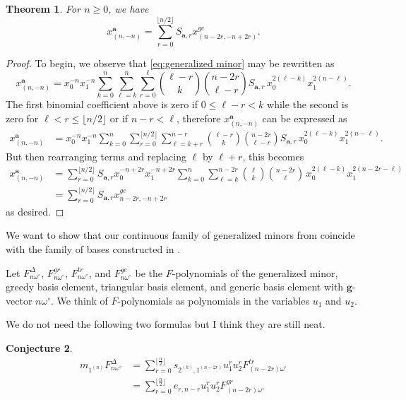\documentclass{amsart}
\newtheorem{theorem}{Theorem}
\newtheorem{conjecture}[theorem]{Conjecture}
\numberwithin{theorem}{section}
\newcommand{\bfa}{\boldsymbol{a}}
\newcommand{\bfg}{\boldsymbol{g}}
\begin{document}
  \begin{theorem}
    For $n\ge0$, we have
    \[
      x_{(n,-n)}^{\bfa}
      =
      \sum_{r=0}^{\lfloor n/2 \rfloor}
      S_{\bfa,r}
      x_{(n-2r,-n+2r)}^{ge}.
    \]
  \end{theorem}
  \begin{proof}
    To begin, we observe that \eqref{eq:generalized minor} may be rewritten as
    \[
      x_{(n,-n)}^{\bfa} = x_0^{-n} x_1^{-n} \sum_{k=0}^n \sum_{\ell=k}^n \sum_{r=0}^\ell {\ell-r\choose k} {n-2r\choose \ell-r} S_{\bfa,r}  \, x_0^{2(\ell-k)} x_1^{2(n-\ell)}.
    \]
    The first binomial coefficient above is zero if $0 \le \ell-r < k$ while the second is zero for $\ell < r \le \lfloor n/2\rfloor$ or if $n-r < \ell$, therefore $x_{(n,-n)}^{\bfa}$ can be expressed as
    \begin{align*}
      x_{(n,-n)}^{\bfa}
      &=
      x_0^{-n} x_1^{-n} \sum_{k=0}^n \sum_{r=0}^{\lfloor n/2\rfloor} \sum_{\ell=k+r}^{n-r} {\ell-r\choose k} {n-2r\choose \ell-r} S_{\bfa,r}  \, x_0^{2(\ell-k)} x_1^{2(n-\ell)}.
    \end{align*}
    But then rearranging terms and replacing $\ell$ by $\ell+r$, this becomes
    \begin{align*}
      x_{(n,-n)}^{\bfa}
      &=
      \sum_{r=0}^{\lfloor n/2\rfloor} S_{\bfa,r} x_0^{-n+2r} x_1^{-n+2r} \sum_{k=0}^n \sum_{\ell=k}^{n-2r} {\ell\choose k} {n-2r\choose \ell} \, x_0^{2(\ell-k)} x_1^{2(n-2r-\ell)}\\
      &=
      \sum_{r=0}^{\lfloor n/2\rfloor} S_{\bfa,r} x_{n-2r,-n+2r}^{ge}
    \end{align*}
    as desired.
  \end{proof}

  We want to show that our continuous family of generalized minors from \cite[Theorem 4.6]{RSW19} coincide with the family of bases constructed in \cite[Theorem 1.2.1]{Qin19}.
  
  Let $F_{n\omega^\circ}^\Delta$, $F_{n\omega^\circ}^{gr}$, $F_{n\omega^\circ}^{tr}$, and $F_{n\omega^\circ}^{ge}$ be the $F$-polynomials of the generalized minor, greedy basis element, triangular basis element, and generic basis element with $\bfg$-vector $n\omega^\circ$.
  We think of $F$-polynomials as polynomials in the variables $u_1$ and $u_2$.

  We do not need the following two formulas but I think they are still neat.
  \begin{conjecture}
    \begin{align*} 
      m_{1^{(n)}} F_{n\omega^\circ}^\Delta
      &=
      \sum_{r=0}^{\lfloor \frac{n}{2} \rfloor}
      s_{2^{(k)},1^{(n-2r)}}
      u_1^r u_2^r
      F_{(n-2r)\omega^\circ}^{tr}
      \\&=
      \sum_{r=0}^{\lfloor \frac{n}{2} \rfloor}
      e_{r,n-r}
      u_1^r u_2^r
      F_{(n-2r)\omega^\circ}^{gr}
    \end{align*}
  \end{conjecture}
\end{document}
